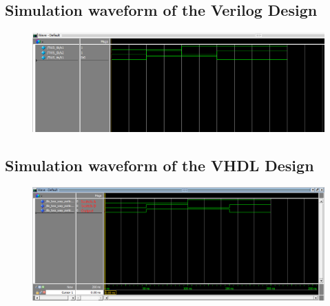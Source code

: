 \documentclass[12pt]{article}
\begin{document}
\subsection{Simulation waveform of the Verilog Design}

\begin{figure}[H]
    \centering
    \includegraphics[width = 14cm,keepaspectratio]{simulation_waveform_verilog/Simulation_waveform.png}
\end{figure}

\subsection{Simulation waveform of the VHDL Design}

\begin{figure}[H]
    \centering
    \includegraphics[width = 14cm,keepaspectratio]{op.png}
\end{figure}
\end{document}
